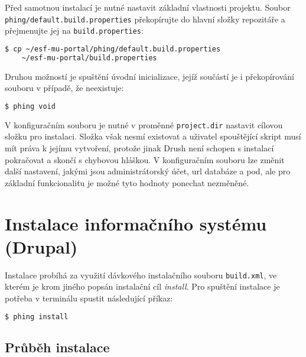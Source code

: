Před samotnou instalací je nutné nastavit základní vlastnosti projektu. Soubor \texttt{phing/default.build.properties} překopírujte do hlavní složky repozitáře a přejmenujte jej na \texttt{build.properties}:

\begin{lstlisting}[language=bash]
  $ cp ~/esf-mu-portal/phing/default.build.properties 
    ~/esf-mu-portal/build.properties
\end{lstlisting}

Druhou možností je spuštění úvodní inicializace, jejíž součástí je i překopírování souboru v případě, že neexistuje:

\begin{lstlisting}[language=bash]
  $ phing void
\end{lstlisting}

V konfiguračním souboru je nutné v proměnné \texttt{project.dir} nastavit cílovou složku pro instalaci. Složka však nesmí existovat a uživatel spouštějící skript musí mít práva k jejímu vytvoření, protože jinak Drush není schopen s instalací pokračovat a skončí s chybovou hláškou. V konfiguračním souboru lze změnit další nastavení, jakými jsou administrátorský účet, url databáze a pod, ale pro základní funkcionalitu je možné tyto hodnoty ponechat nezměněné.

\section{Instalace informačního systému (Drupal)}
Instalace probíhá za využití dávkového instalačního souboru \texttt{build.xml}, ve kterém je krom jiného popsán instalační cíl \emph{install}. Pro spuštění instalace je potřeba v terminálu spustit následující příkaz:

\begin{lstlisting}[language=bash]
  $ phing install
\end{lstlisting}

\subsection*{Průběh instalace}

